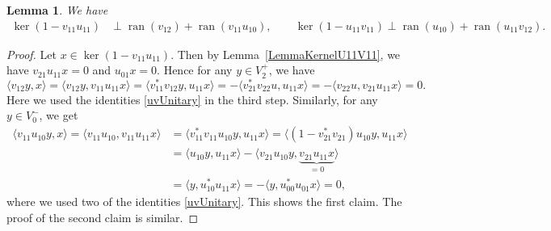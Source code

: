 \documentclass[pdftex]{sigma}
\numberwithin{equation}{section}
\newtheorem{Lemma}[Theorem]{Lemma}
\DeclareMathOperator*{\ran}{ran}
\begin{document}
\begin{Lemma} \label{LemmaComplementOfRange}
 We have
 \begin{align*}
 \ker(1 - v_{11} u_{11}) &\perp \ran(v_{12}) + \ran(v_{11} u_{10}),\qquad \ker(1 - u_{11} v_{11}) \perp \ran (u_{10}) + \ran (u_{11} v_{12}).
 \end{align*}
\end{Lemma}

\begin{proof}
Let $x \in \ker(1-v_{11} u_{11})$. Then by Lemma~\ref{LemmaKernelU11V11}, we have $v_{21} u_{11} x = 0$ and $u_{01} x= 0$. Hence for any $y \in V_2^+$, we have
\begin{equation*}
 \langle v_{12} y, x \rangle = \langle v_{12} y, v_{11} u_{11} x \rangle = \langle v_{11}^* v_{12} y, u_{11} x \rangle = - \langle v_{21}^* v_{22} u, u_{11} x\rangle = -\langle v_{22} u, v_{21} u_{11} x\rangle = 0.
\end{equation*}
Here we used the identities \eqref{uvUnitary} in the third step. Similarly, for any $y \in V_0^-$, we get
\begin{align*}
 \langle v_{11} u_{10} y, x\rangle = \langle v_{11} u_{10}, v_{11} u_{11} x\rangle &= \langle v_{11}^* v_{11} u_{10} y, u_{11} x \rangle = \langle (1- v_{21}^* v_{21}) u_{10} y, u_{11} x\rangle \\
 &= \langle u_{10} y, u_{11} x \rangle - \langle v_{21} u_{10} y, \underbrace{v_{21} u_{11} x}_{=0} \rangle\\
 &= \langle y, u_{10}^*u_{11} x \rangle = -\langle y, u_{00}^*u_{01} x \rangle = 0,
\end{align*}
where we used two of the identities \eqref{uvUnitary}.
This shows the first claim.
The proof of the second claim is similar.
\end{proof}
\end{document}
